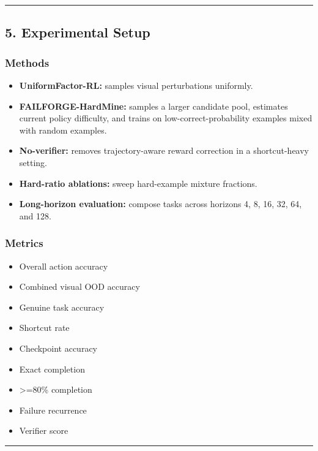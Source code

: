 \documentclass[
]{article}
\providecommand{\tightlist}{%
  \setlength{\itemsep}{0pt}\setlength{\parskip}{0pt}}
\begin{document}
\begin{center}\rule{0.5\linewidth}{0.5pt}\end{center}

\subsection{5. Experimental Setup}\label{experimental-setup}

\subsubsection{Methods}\label{methods}

\begin{itemize}
\tightlist
\item
  \textbf{UniformFactor-RL:} samples visual perturbations uniformly.
\item
  \textbf{FAILFORGE-HardMine:} samples a larger candidate pool,
  estimates current policy difficulty, and trains on
  low-correct-probability examples mixed with random examples.
\item
  \textbf{No-verifier:} removes trajectory-aware reward correction in a
  shortcut-heavy setting.
\item
  \textbf{Hard-ratio ablations:} sweep hard-example mixture fractions.
\item
  \textbf{Long-horizon evaluation:} compose tasks across horizons 4, 8,
  16, 32, 64, and 128.
\end{itemize}

\subsubsection{Metrics}\label{metrics}

\begin{itemize}
\tightlist
\item
  Overall action accuracy
\item
  Combined visual OOD accuracy
\item
  Genuine task accuracy
\item
  Shortcut rate
\item
  Checkpoint accuracy
\item
  Exact completion
\item
  >=80\% completion
\item
  Failure recurrence
\item
  Verifier score
\end{itemize}

\begin{center}\rule{0.5\linewidth}{0.5pt}\end{center}
\end{document}
